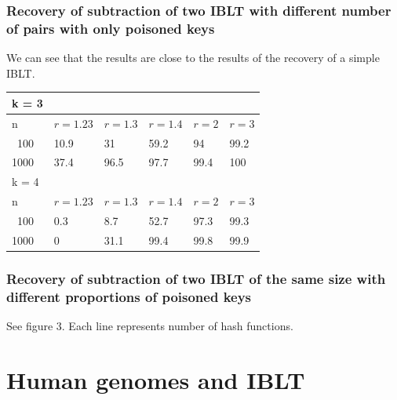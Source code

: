 \documentclass{article}
\begin{document}
\subsubsection{Recovery of subtraction of two IBLT with different number of pairs with only poisoned keys}
We can see that the results are close to the results of the recovery of a simple IBLT. 
\begin{center}
\begin{tabular}{l | l | l | l | l | l} \hline \hline k = 3 \\ \hline
    \hline n & $r = 1.23$ &  $r = 1.3$  &  $r = 1.4$ & $r = 2$ & $r = 3$\\ \hline
    \hline \ 100 & 10.9 & 31 & 59.2 & 94 & 99.2 \\ \hline 
    1000 & 37.4 & 96.5 & 97.7 & 99.4 & 100 \\ \hline
    \hline
    k = 4 \\
    \hline
    \hline n & $r = 1.23$ &  $r = 1.3$  &  $r = 1.4$ & $r = 2$ & $r = 3$\\ \hline
    \hline \ 100 & 0.3 & 8.7 & 52.7 & 97.3 & 99.3 \\ \hline 
    1000 & 0 & 31.1 & 99.4 & 99.8 & 99.9 \\ \hline
\end{tabular}
\end{center}


\subsubsection{Recovery of subtraction of two IBLT of the same size with different proportions of poisoned keys}
See figure 3. Each line represents number of hash functions.

\section{Human genomes and IBLT}
\end{document}
